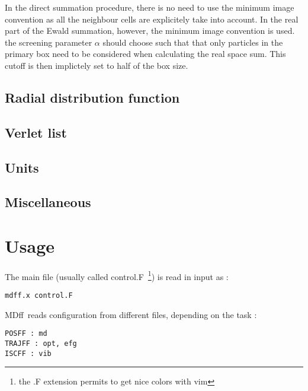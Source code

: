 \documentclass[a4paper,8pt]{article}
\newcommand{\MDFF}{{\sc MDff}}
\begin{document}
In the direct summation procedure, there is no need to use the minimum
 image convention as all the neighbour cells are explicitely take into account.
In the real part of the Ewald summation, however, the minimum image convention
is used. the screening parameter $\alpha$ should choose such that that only particles
in the primary box need to be considered when calculating the real space sum.
This cutoff is then implictely set to half of the box size.


\subsection{Radial distribution function\label{sec:GR}}

\subsection{Verlet list\label{sec:vnlist}}

\subsection{Units \label{sec:units}}

\subsection{Miscellaneous \label{sec:misc}}

\section{Usage}

The main file (usually called control.F~\footnote{the .F extension permits to get nice colors with vim}) is read in input as :
\begin{verbatim}
mdff.x control.F
\end{verbatim}

\MDFF~reads configuration from different files, depending on the task :
\begin{verbatim}
POSFF : md
TRAJFF : opt, efg
ISCFF : vib
\end{verbatim}
\end{document}
